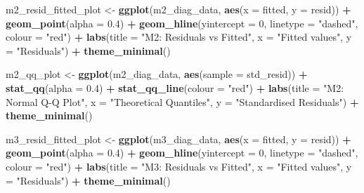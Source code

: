 \documentclass[
]{article}
\newenvironment{Shaded}{\begin{snugshade}}{\end{snugshade}}
\newcommand{\AttributeTok}[1]{\textcolor[rgb]{0.13,0.29,0.53}{#1}}
\newcommand{\DecValTok}[1]{\textcolor[rgb]{0.00,0.00,0.81}{#1}}
\newcommand{\FloatTok}[1]{\textcolor[rgb]{0.00,0.00,0.81}{#1}}
\newcommand{\FunctionTok}[1]{\textcolor[rgb]{0.13,0.29,0.53}{\textbf{#1}}}
\newcommand{\NormalTok}[1]{#1}
\newcommand{\OtherTok}[1]{\textcolor[rgb]{0.56,0.35,0.01}{#1}}
\newcommand{\SpecialCharTok}[1]{\textcolor[rgb]{0.81,0.36,0.00}{\textbf{#1}}}
\newcommand{\StringTok}[1]{\textcolor[rgb]{0.31,0.60,0.02}{#1}}
\begin{document}
\begin{Shaded}
\begin{Highlighting}[]
\NormalTok{m2\_resid\_fitted\_plot }\OtherTok{\textless{}{-}} \FunctionTok{ggplot}\NormalTok{(m2\_diag\_data, }\FunctionTok{aes}\NormalTok{(}\AttributeTok{x =}\NormalTok{ fitted, }\AttributeTok{y =}\NormalTok{ resid)) }\SpecialCharTok{+}
  \FunctionTok{geom\_point}\NormalTok{(}\AttributeTok{alpha =} \FloatTok{0.4}\NormalTok{) }\SpecialCharTok{+}
  \FunctionTok{geom\_hline}\NormalTok{(}\AttributeTok{yintercept =} \DecValTok{0}\NormalTok{, }\AttributeTok{linetype =} \StringTok{"dashed"}\NormalTok{, }\AttributeTok{colour =} \StringTok{"red"}\NormalTok{) }\SpecialCharTok{+}
  \FunctionTok{labs}\NormalTok{(}\AttributeTok{title =} \StringTok{"M2: Residuals vs Fitted"}\NormalTok{, }\AttributeTok{x =} \StringTok{"Fitted values"}\NormalTok{, }\AttributeTok{y =} \StringTok{"Residuals"}\NormalTok{) }\SpecialCharTok{+}
  \FunctionTok{theme\_minimal}\NormalTok{()}

\NormalTok{m2\_qq\_plot }\OtherTok{\textless{}{-}} \FunctionTok{ggplot}\NormalTok{(m2\_diag\_data, }\FunctionTok{aes}\NormalTok{(}\AttributeTok{sample =}\NormalTok{ std\_resid)) }\SpecialCharTok{+}
  \FunctionTok{stat\_qq}\NormalTok{(}\AttributeTok{alpha =} \FloatTok{0.4}\NormalTok{) }\SpecialCharTok{+}
  \FunctionTok{stat\_qq\_line}\NormalTok{(}\AttributeTok{colour =} \StringTok{"red"}\NormalTok{) }\SpecialCharTok{+}
  \FunctionTok{labs}\NormalTok{(}\AttributeTok{title =} \StringTok{"M2: Normal Q{-}Q Plot"}\NormalTok{,}
       \AttributeTok{x =} \StringTok{"Theoretical Quantiles"}\NormalTok{, }\AttributeTok{y =} \StringTok{"Standardised Residuals"}\NormalTok{) }\SpecialCharTok{+}
  \FunctionTok{theme\_minimal}\NormalTok{()}

\NormalTok{m3\_resid\_fitted\_plot }\OtherTok{\textless{}{-}} \FunctionTok{ggplot}\NormalTok{(m3\_diag\_data, }\FunctionTok{aes}\NormalTok{(}\AttributeTok{x =}\NormalTok{ fitted, }\AttributeTok{y =}\NormalTok{ resid)) }\SpecialCharTok{+}
  \FunctionTok{geom\_point}\NormalTok{(}\AttributeTok{alpha =} \FloatTok{0.4}\NormalTok{) }\SpecialCharTok{+}
  \FunctionTok{geom\_hline}\NormalTok{(}\AttributeTok{yintercept =} \DecValTok{0}\NormalTok{, }\AttributeTok{linetype =} \StringTok{"dashed"}\NormalTok{, }\AttributeTok{colour =} \StringTok{"red"}\NormalTok{) }\SpecialCharTok{+}
  \FunctionTok{labs}\NormalTok{(}\AttributeTok{title =} \StringTok{"M3: Residuals vs Fitted"}\NormalTok{, }\AttributeTok{x =} \StringTok{"Fitted values"}\NormalTok{, }\AttributeTok{y =} \StringTok{"Residuals"}\NormalTok{) }\SpecialCharTok{+}
  \FunctionTok{theme\_minimal}\NormalTok{()}


\end{Highlighting}
\end{Shaded}
\end{document}
